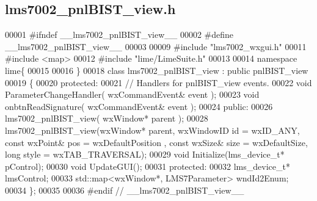 \subsection{lms7002\+\_\+pnl\+B\+I\+S\+T\+\_\+view.\+h}
\label{lms7002__pnlBIST__view_8h_source}

\begin{DoxyCode}
00001 \textcolor{preprocessor}{#ifndef \_\_lms7002\_pnlBIST\_view\_\_}
00002 \textcolor{preprocessor}{#define \_\_lms7002\_pnlBIST\_view\_\_}
00003 
00009 \textcolor{preprocessor}{#include "lms7002_wxgui.h"}
00011 \textcolor{preprocessor}{#include <map>}
00012 \textcolor{preprocessor}{#include "lime/LimeSuite.h"}
00013 
00014 \textcolor{keyword}{namespace }lime\{
00015 
00016 \}
00018 \textcolor{keyword}{class }lms7002_pnlBIST_view : \textcolor{keyword}{public} pnlBIST_view
00019 \{
00020     \textcolor{keyword}{protected}:
00021         \textcolor{comment}{// Handlers for pnlBIST\_view events.}
00022         \textcolor{keywordtype}{void} ParameterChangeHandler( wxCommandEvent& event );
00023         \textcolor{keywordtype}{void} onbtnReadSignature( wxCommandEvent& event );
00024     \textcolor{keyword}{public}:
00026         lms7002_pnlBIST_view( wxWindow* parent );
00028     lms7002_pnlBIST_view(wxWindow* parent, wxWindowID \textcolor{keywordtype}{id} = wxID\_ANY, \textcolor{keyword}{const} wxPoint& pos = wxDefaultPosition
      , \textcolor{keyword}{const} wxSize& size = wxDefaultSize, \textcolor{keywordtype}{long} style = wxTAB\_TRAVERSAL);
00029     \textcolor{keywordtype}{void} Initialize(lms_device_t* pControl);
00030     \textcolor{keywordtype}{void} UpdateGUI();
00031 \textcolor{keyword}{protected}:
00032     lms_device_t* lmsControl;
00033     std::map<wxWindow*, LMS7Parameter> wndId2Enum;
00034 \};
00035 
00036 \textcolor{preprocessor}{#endif // \_\_lms7002\_pnlBIST\_view\_\_}
\end{DoxyCode}
